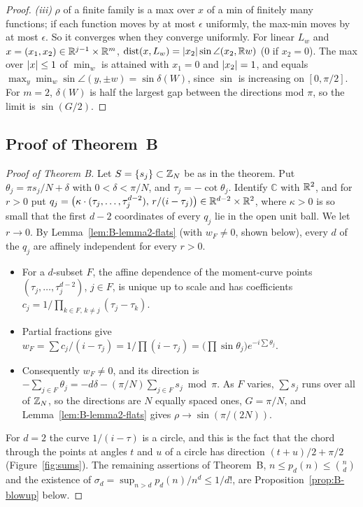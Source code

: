 \documentclass[11pt]{article}
\begin{document}
\begin{proof}
\emph{(iii)} $\rho$ of a finite family is a max over $x$ of a min of finitely many functions; if
each function moves by at most $\epsilon$ uniformly, the max-min moves by at most $\epsilon$. So it
converges when they converge uniformly. For linear $L_w$ and
$x = (x_1, x_2) \in \mathbb{R}^{j-1} \times \mathbb{R}^m$, $\operatorname{dist}(x, L_w) = \left|x_2\right| \sin \angle(x_2, \mathbb{R} w)$
($0$ if $x_2 = 0$). The max over $\left|x\right| \le 1$ of $\min_w$ is attained with $x_1 = 0$ and
$\left|x_2\right| = 1$, and equals $\max_y \min_w \sin \angle(y, \pm w) = \sin \delta(W)$, since $\sin$ is
increasing on $[0, \pi/2]$. For $m = 2$, $\delta(W)$ is half the largest gap between the
directions mod $\pi$, so the limit is $\sin(G/2)$.
\end{proof}

\subsection{Proof of Theorem~B}\label{sec:thmB}

\begin{proof}[Proof of Theorem B]
Let $S=\{s_j\}\subset\mathbb{Z}_N$ be as in the theorem. Put $\theta_j=\pi s_j/N+\delta$ with
$0<\delta<\pi/N$, and $\tau_j=-\cot\theta_j$. Identify $\mathbb C$ with $\mathbb{R}^2$, and for $r>0$ put
$q_j=\bigl(\kappa\cdot(\tau_j,\dots,\tau_j^{d-2}),\,r/(i-\tau_j)\bigr)\in\mathbb{R}^{d-2}\times\mathbb{R}^2$, where
$\kappa>0$ is so small that the first $d-2$ coordinates of every $q_j$ lie in the open unit ball. We let
$r\to0$. By
Lemma~\ref{lem:B-lemma2-flats} (with $w_F\ne0$, shown below), every $d$ of the $q_j$ are affinely independent for every $r>0$.
\begin{itemize}
\item For a $d$-subset $F$, the affine dependence of the moment-curve points
$(\tau_j,\dots,\tau_j^{d-2})$, $j\in F$, is unique up to scale and has coefficients
$c_j=1/\prod_{k\in F,\,k\ne j}(\tau_j-\tau_k)$.
\item Partial fractions give
$w_F=\sum c_j/(i-\tau_j)=1/\prod(i-\tau_j)=\bigl(\prod\sin\theta_j\bigr)e^{-i\sum\theta_j}$.
\item Consequently $w_F\ne0$, and its direction is $-\sum_{j\in F}\theta_j=-d\delta-(\pi/N)\sum_{j\in F}s_j\bmod\pi$. As
$F$ varies, $\sum s_j$ runs over all of $\mathbb{Z}_N$, so the directions are $N$ equally spaced ones,
$G=\pi/N$, and Lemma~\ref{lem:B-lemma2-flats} gives $\rho\to\sin(\pi/(2N))$.
\end{itemize}
For $d=2$ the curve $1/(i-\tau)$ is a circle, and this is the fact that the chord through the points at angles $t$ and $u$ of a circle has
direction $(t+u)/2+\pi/2$ (Figure~\ref{fig:sums}).
The remaining assertions of Theorem~B, $n\le p_d(n)\le\binom nd$ and the existence of
$\sigma_d=\sup_{n>d}p_d(n)/n^d\le1/d!$, are Proposition~\ref{prop:B-blowup} below.
\end{proof}
\end{document}
